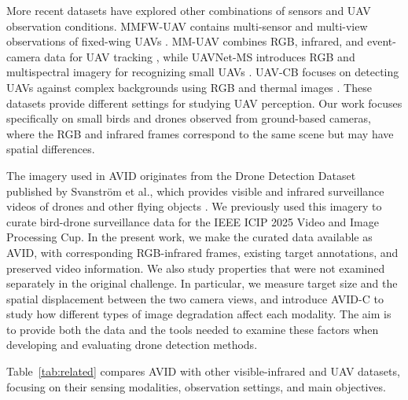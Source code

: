 \documentclass[10pt]{article}
\newcommand{\dataset}{\textsc{AVID}}
\newcommand{\corrupt}{\textsc{AVID-C}}
\begin{document}
More recent datasets have explored other combinations of sensors and UAV observation conditions. MMFW-UAV contains multi-sensor and multi-view observations of fixed-wing UAVs \citep{liu2025mmfwuav}. MM-UAV combines RGB, infrared, and event-camera data for UAV tracking \citep{xu2025mmuav}, while UAVNet-MS introduces RGB and multispectral imagery for recognizing small UAVs \citep{luo2026uavnetms}. UAV-CB focuses on detecting UAVs against complex backgrounds using RGB and thermal images \citep{huang2026uavcb}. These datasets provide different settings for studying UAV perception. Our work focuses specifically on small birds and drones observed from ground-based cameras, where the RGB and infrared frames correspond to the same scene but may have spatial differences.

The imagery used in \dataset{} originates from the Drone Detection Dataset published by Svanstr\"om et al., which provides visible and infrared surveillance videos of drones and other flying objects \citep{svanstrom2021multisensor}. We previously used this imagery to curate bird-drone surveillance data for the IEEE ICIP 2025 Video and Image Processing Cup. In the present work, we make the curated data available as \dataset{}, with corresponding RGB-infrared frames, existing target annotations, and preserved video information. We also study properties that were not examined separately in the original challenge. In particular, we measure target size and the spatial displacement between the two camera views, and introduce \corrupt{} to study how different types of image degradation affect each modality. The aim is to provide both the data and the tools needed to examine these factors when developing and evaluating drone detection methods.

Table~\ref{tab:related} compares \dataset{} with other visible-infrared and UAV datasets, focusing on their sensing modalities, observation settings, and main objectives.
\end{document}
